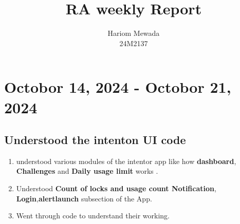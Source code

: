 \documentclass[12pt]{article}
\begin{document}
    
    \title{RA weekly Report}
    \author{Hariom Mewada\\
    24M2137}
    \maketitle
    
    \newpage
    \tableofcontents
    \newpage
    
    \section{Octobor 14, 2024 - Octobor 21, 2024}
    
    \subsection{Understood the intenton UI code}
        \begin{enumerate}
            \item understood various modules of the intentor app like how
            \textbf  {dashboard}, \textbf{Challenges} and \textbf{Daily usage limit} works
            .
            \item Understood  \textbf{ Count of locks and usage count Notification}, \textbf{Login},\textbf{alertlaunch} subsection of the App.
    
            
            \item Went through code  to understand their working. 
        \end{enumerate}
        
\end{document}
